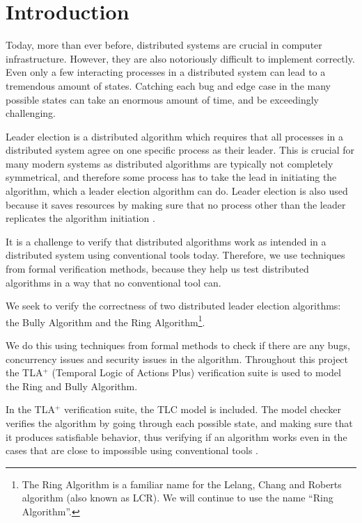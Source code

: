 \documentclass{report}
\begin{document}
\tableofcontents
\chapter{Introduction}


Today, more than ever before, distributed systems are crucial in computer infrastructure. However, they are also notoriously difficult to implement correctly. Even only a few interacting processes in a distributed system can lead to a tremendous amount of states. Catching each bug and edge case in the many possible states can take an enormous amount of time, and be exceedingly challenging.

Leader election is a distributed algorithm which requires that all processes in a distributed system agree on one specific process as their leader. This is crucial for many modern systems as distributed algorithms are typically not completely symmetrical, and therefore some process has to take the lead in initiating the algorithm, which a leader election algorithm can do. Leader election is also used because it saves resources by making sure that no process other than the leader replicates the algorithm initiation \cite{kshemkalyani2011distributed}.

It is a challenge to verify that distributed algorithms work as intended in a distributed system using conventional tools today. Therefore, we use techniques from formal verification methods, because they help us test distributed algorithms in a way that no conventional tool can.

We seek to verify the correctness of two distributed leader election algorithms: the Bully Algorithm and the Ring Algorithm\footnote{The Ring Algorithm is a familiar name for the Lelang, Chang and Roberts algorithm (also known as LCR). We will continue to use the name ``Ring Algorithm''.}.

We do this using techniques from formal methods to check if there are any bugs, concurrency issues and security issues in the algorithm. Throughout this project the TLA$^{+}$ (Temporal Logic of Actions Plus) verification suite is used to model the Ring and Bully Algorithm.

In the TLA$^{+}$ verification suite, the TLC model is included. The model checker verifies the algorithm by going through each possible state, and making sure that it produces satisfiable behavior, thus verifying if an algorithm works even in the cases that are close to impossible using conventional tools \cite{tla+}.
\end{document}
